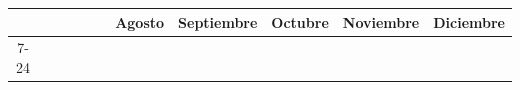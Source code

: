 \begin{table}[]
\begin{tabular}{ccc|c|cccllcllllllllllllll|}
\multicolumn{1}{|c|}{}                            & \multicolumn{1}{c|}{}                              &                                                                                                                                                                                                                                                                        &                                                                                                                                                                                                                                                                                                                                                             & \multicolumn{1}{c|}{}                                                                                                                                                                                                                                                                               & \multicolumn{1}{c|}{}                              & \multicolumn{3}{c|}{Agosto}                   & \multicolumn{5}{c|}{Septiembre}                                                                                                                                         & \multicolumn{4}{c|}{Octubre}                                                                                                          & \multicolumn{4}{c|}{Noviembre}                                                                                                        & \multicolumn{2}{c|}{Diciembre}                                    \\ \cline{7-24} 

\end{tabular}
\end{table}

